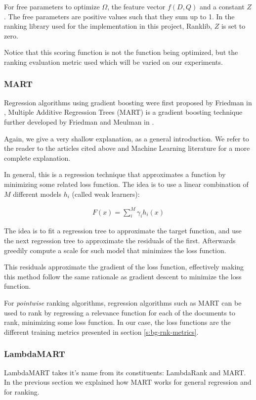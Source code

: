 For free parameters to optimize $\Omega$, the feature vector $f(D, Q)$ and a constant $Z$. The free parameters are positive 
values such that they sum up to 1. In the ranking library used for the implementation in this project, Ranklib, $Z$ is set to zero.

Notice that this scoring function is not the function being optimized, but the ranking evaluation metric used
which will be varied on our experiments.

\subsubsection{MART}
Regression algorithms using gradient boosting were first proposed by Friedman in \cite{Friedman2001GreedyFA},
Multiple Additive Regression Trees (MART) is a gradient boosting technique further developed by Friedman and
Meulman in \cite{Friedman2003MultipleAR}.

Again, we give a very shallow explanation, as a general introduction. We refer to the reader to the articles
cited above and Machine Learning literature for a more complete explanation.

In general, this is a regression technique that approximates a function by minimizing some related loss 
function. The idea is to use a linear combination of $M$ different models $h_i$ (called weak learners):

\begin{align*}
F(x) = \sum_{i}^M \gamma_i h_i(x)
\end{align*}

The idea is to fit a regression tree to approximate the target function, and use the next regression tree to
approximate the residuals of the first. Afterwards greedily compute a scale for such model that minimizes
the loss function.

This residuals approximate the gradient of the loss function, effectively making this method follow the same
rationale as gradient descent to minimize the loss function.

For \emph{pointwise} ranking algorithms, regression algorithms such as MART can be used to rank
by regressing a relevance function for each of the documents to rank, minimizing some loss function.
In our case, the loss functions are the different training metrics presented in section \ref{s:bg-rnk-metrics}.

\subsubsection{LambdaMART}
LambdaMART takes it's name from its constituents: LambdaRank and MART. In the previous section we 
explained how MART works for general regression and for ranking.

